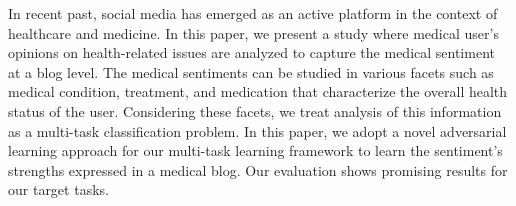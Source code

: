In recent past, social media has emerged as an active platform in the context of healthcare and medicine. In this paper, we present a study where medical user's opinions on health-related issues are analyzed to capture the medical sentiment at a blog level. The medical sentiments can be studied in various facets such as medical condition, treatment, and medication that characterize the overall health status of the user. Considering these facets, we treat analysis of this information as a multi-task classification problem. In this paper, we adopt a novel adversarial learning approach for our multi-task learning framework to learn the sentiment's strengths expressed in a medical blog. Our evaluation shows promising results for our target tasks.
